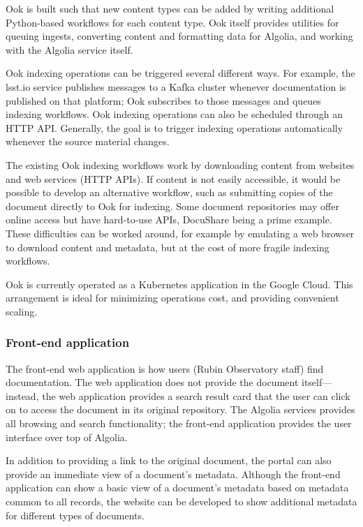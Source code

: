 Ook is built such that new content types can be added by writing additional Python-based workflows for each content type.
Ook itself provides utilities for queuing ingests, converting content and formatting data for Algolia, and working with the Algolia service itself.

Ook indexing operations can be triggered several different ways.
For example, the lsst.io service publishes messages to a Kafka cluster whenever documentation is published on that platform; Ook subscribes to those messages and queues indexing workflows.
Ook indexing operations can also be scheduled through an HTTP API.
Generally, the goal is to trigger indexing operations automatically whenever the source material changes.

The existing Ook indexing workflows work by downloading content from websites and web services (HTTP APIs).
If content is not easily accessible, it would be possible to develop an alternative workflow, such as submitting copies of the document directly to Ook for indexing.
Some document repositories may offer online access but have hard-to-use APIs, DocuShare being a prime example.
These difficulties can be worked around, for example by emulating a web browser to download content and metadata, but at the cost of more fragile indexing workflows.

Ook is currently operated as a Kubernetes application in the Google Cloud.
This arrangement is ideal for minimizing operations cost, and providing convenient scaling.

\subsubsection{Front-end application}

The front-end web application is how users (Rubin Observatory staff) find documentation.
The web application does not provide the document itself—instead, the web application provides a search result card that the user can click on to access the document in its original repository.
The Algolia services provides all browsing and search functionality; the front-end application provides the user interface over top of Algolia.

In addition to providing a link to the original document, the portal can also provide an immediate view of a document's metadata.
Although the front-end application can show a basic view of a document's metadata based on metadata common to all records, the website can be developed to show additional metadata for different types of documents.

